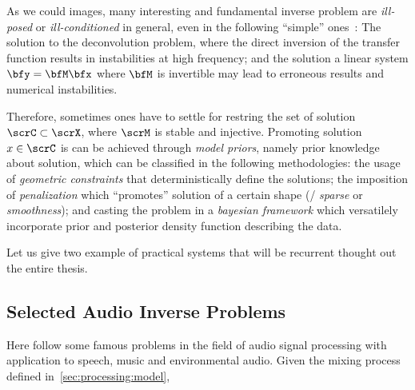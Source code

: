 As we could images, many interesting and fundamental inverse problem are
\textit{ill-posed} or \textit{ill-conditioned} in general, even in the following ``simple'' ones~\cite{kitic2015cosparse}:
The solution to the deconvolution problem, where the direct inversion of the transfer function results in instabilities
at high frequency; and the solution a linear system $\bfy = \bfM \bfx$ where $\bfM$ is invertible
may lead to erroneous results and numerical instabilities.

Therefore, sometimes ones have to settle for restring the set of solution $\scrC \subset \scrX$,
where $\scrM$ is stable and injective.
Promoting solution $x \in \scrC$ is can be achieved through \textit{model priors}, namely prior knowledge about solution, which can
be classified in the following methodologies:
the usage of \textit{geometric constraints} that deterministically define the solutions; the imposition of \textit{penalization}
which ``promotes'' solution of a certain shape (\eg/ \textit{sparse}
 or \textit{smoothness});
and casting the problem in a \textit{bayesian framework} which versatilely incorporate prior and posterior density function describing the data.

Let us give two example of practical systems that will be recurrent thought out the entire thesis.

\subsection{Selected Audio Inverse Problems}
Here follow some famous problems in the field of audio signal processing with application to speech, music and environmental audio.
Given the mixing process defined in~\cref{sec:processing:model},


